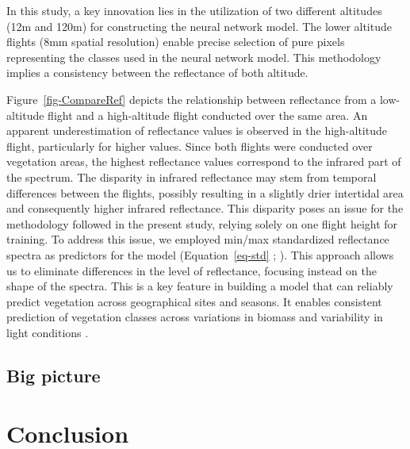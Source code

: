 \documentclass[
  number]{elsarticle}
\begin{document}
In this study, a key innovation lies in the utilization of two different
altitudes (12m and 120m) for constructing the neural network model. The
lower altitude flights (8mm spatial resolution) enable precise selection
of pure pixels representing the classes used in the neural network
model. This methodology implies a consistency between the reflectance of
both altitude.

Figure~\ref{fig-CompareRef} depicts the relationship between reflectance
from a low-altitude flight and a high-altitude flight conducted over the
same area. An apparent underestimation of reflectance values is observed
in the high-altitude flight, particularly for higher values. Since both
flights were conducted over vegetation areas, the highest reflectance
values correspond to the infrared part of the spectrum. The disparity in
infrared reflectance may stem from temporal differences between the
flights, possibly resulting in a slightly drier intertidal area and
consequently higher infrared reflectance. This disparity poses an issue
for the methodology followed in the present study, relying solely on one
flight height for training. To address this issue, we employed min/max
standardized reflectance spectra as predictors for the model
(Equation~\ref{eq-std} ; \citep{Cao2017}). This approach allows us to
eliminate differences in the level of reflectance, focusing instead on
the shape of the spectra. This is a key feature in building a model that
can reliably predict vegetation across geographical sites and seasons.
It enables consistent prediction of vegetation classes across variations
in biomass and variability in light conditions \citetext{\citealp[
]{fyfe2003spatial}; \citealp[
]{COSTA2021107018}; \citealp{piaser2023impact}}.

\subsection{Big picture}\label{big-picture}

\section{Conclusion}\label{conclusion}


\renewcommand\refname{Bibliography}
  
\end{document}
